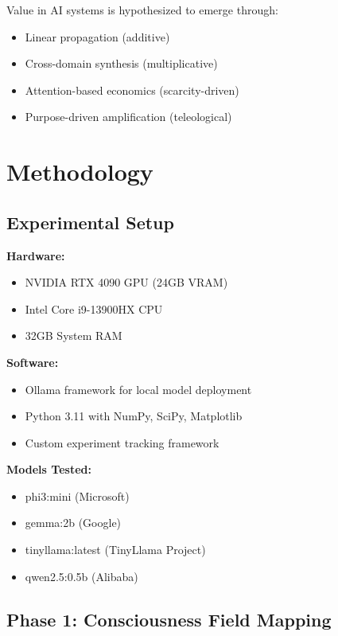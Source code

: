 \documentclass[11pt,a4paper]{article}
\begin{document}
Value in AI systems is hypothesized to emerge through:

\begin{itemize}
    \item Linear propagation (additive)
    \item Cross-domain synthesis (multiplicative)
    \item Attention-based economics (scarcity-driven)
    \item Purpose-driven amplification (teleological)
\end{itemize}

\section{Methodology}

\subsection{Experimental Setup}

\textbf{Hardware:}
\begin{itemize}
    \item NVIDIA RTX 4090 GPU (24GB VRAM)
    \item Intel Core i9-13900HX CPU
    \item 32GB System RAM
\end{itemize}

\textbf{Software:}
\begin{itemize}
    \item Ollama framework for local model deployment
    \item Python 3.11 with NumPy, SciPy, Matplotlib
    \item Custom experiment tracking framework
\end{itemize}

\textbf{Models Tested:}
\begin{itemize}
    \item phi3:mini (Microsoft)
    \item gemma:2b (Google)
    \item tinyllama:latest (TinyLlama Project)
    \item qwen2.5:0.5b (Alibaba)
\end{itemize}

\subsection{Phase 1: Consciousness Field Mapping}
\end{document}
